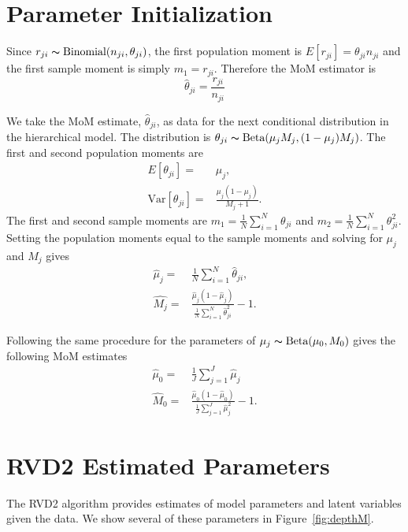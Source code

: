 \documentclass[11pt,reqno]{amsart}
\begin{document}
\section{Parameter Initialization}\label{sec:appendix_mom}
Since $r_{ji} \thicksim \text{Binomial}(n_{ji}, \theta_{ji})$, the first population moment is  $E[r_{ji}] = \theta_{ji} n_{ji}$ and the first sample moment is simply $m_1 = r_{ji}$. Therefore the MoM estimator is
\begin{equation}
	\hat{\theta}_{ji} = \frac{r_{ji}} {n_{ji}}
\end{equation}

We take the MoM estimate, $\hat{\theta}_{ji}$, as data for the next conditional distribution in the hierarchical model. The distribution is $\theta_{ji} \thicksim \text{Beta}(\mu_jM_j, (1-\mu_j)M_j)$. The first and second population moments are
\begin{eqnarray}
	E[\theta_{ji}] =& \mu_j,\\
	\text{Var}[\theta_{ji}] =& \frac{\mu_j(1-\mu_j)} { M_j + 1 }.
\end{eqnarray}
The first and second sample moments are $m_1 = \frac{1}{N}\sum_{i=1}^N \theta_{ji}$ and $m_2 = \frac{1}{N}\sum_{i=1}^N \theta_{ji}^2$. Setting the population moments equal to the sample moments and solving for $\mu_j$ and $M_j$ gives
\begin{eqnarray}
	\hat{\mu}_j =& \frac{1}{N} \sum_{i=1}^N \hat{\theta}_{ji}, \\
	\hat{M_j} =& \frac{ \hat{\mu}_j (1 - \hat{\mu}_j ) } { \frac{1}{N} \sum_{i=1}^N \hat{\theta}_{ji}^2 } -1.
\end{eqnarray}

Following the same procedure for the parameters of $\mu_j \thicksim \text{Beta}(\mu_0, M_0)$ gives the following MoM estimates
\begin{eqnarray}
	\hat{\mu}_0 =& \frac{1}{J} \sum_{j=1}^J \hat{\mu}_j \\
	\hat{M}_0 =& \frac{ \hat{\mu}_0 (1 - \hat{\mu}_0 ) } {\frac{1}{J} \sum_{j=1}^J \hat{\mu}_j^2 } -1.
\end{eqnarray}



\section{RVD2 Estimated Parameters}\label{sec:synthetic_estimate}
The RVD2 algorithm provides estimates of model parameters and latent variables given the data. We show several of these parameters in Figure~\ref{fig:depthM}.
\end{document}
